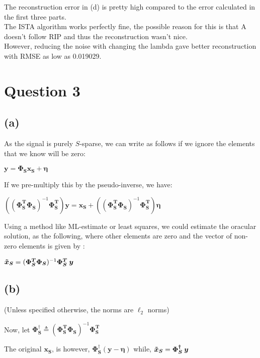 \documentclass[fleqn, 11pt]{article}
\newcommand{\bs}[1]{\boldsymbol{#1}}
\newcommand{\ps}[0]{(\boldsymbol{\Phi^T_S \Phi_S})^{-1} \boldsymbol{\Phi^T_S }}
\newcommand{\pss}[0]{\boldsymbol{\Phi^{\dagger}_S}}
\begin{document}
The reconstruction error in (d) is pretty high compared to the error calculated in the first three parts. \\
The ISTA algorithm works perfectly fine, the possible reason for this is that A doesn't follow RIP and thus the reconstruction wasn't nice. \\
However, reducing the noise with changing the lambda gave better reconstruction with RMSE as low as 0.019029.

\newpage
\section*{Question 3}
\setcounter{equation}{0}

\subsection*{(a)}

As the signal is purely $S$-sparse, we can write as follows if we ignore the 
elements that we know will be zero: 

$\bs{y= \Phi_S x_S + \eta}$

\smallskip

If we pre-multiply this by the pseudo-inverse, we have: 

\smallskip

$(\ps)\bs{y}= \bs{x_S} + (\ps)\bs{\eta}$

\medskip

Using a method like ML-estimate or least squares, we could estimate the oracular solution,
as the following, where other elements are zero and 
the vector of non-zero elements is given by :

$\bs{\Tilde{x}_S}=\ps \:\bs{y}$

\medskip

\subsection*{(b)}

(Unless specified otherwise, the norms are $\ell_2$ norms)

\smallskip

Now, let 
$\boldsymbol{\Phi^{\dagger}_S} \triangleq 
(\boldsymbol{\Phi^T_S \Phi_S})^{-1} \boldsymbol{\Phi^T_S }$

\medskip

The original $\bs{x_S}$, is however, $\pss(\bs{y- \eta})$ 
\hspace{10pt} while, 
$\bs{\Tilde{x}_S}=\pss \:\bs{y}$
\end{document}
